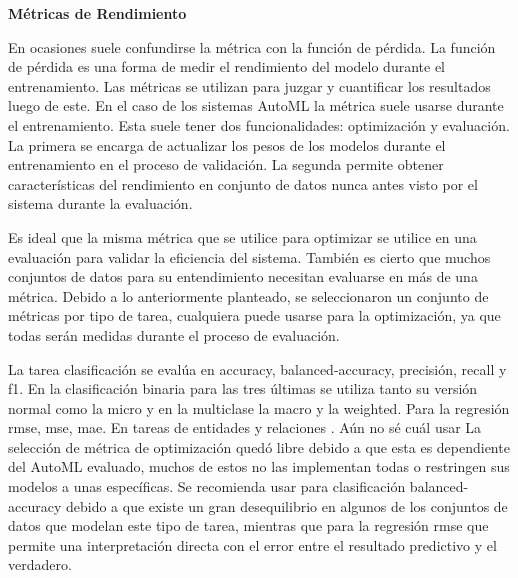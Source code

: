 \begin{flushleft} 
    {\large { \textbf{Métricas de Rendimiento}}}\label{section:metrics}
\end{flushleft}
En ocasiones suele confundirse la métrica con la función de pérdida. La función de pérdida es una forma de medir el rendimiento del modelo durante el 
entrenamiento. Las métricas se utilizan para juzgar y cuantificar los resultados luego de este. En el caso de los sistemas AutoML la métrica suele usarse 
durante el entrenamiento. Esta suele tener dos funcionalidades: optimización y evaluación. La primera se encarga de actualizar los pesos de los modelos durante el 
entrenamiento en el proceso de validación. La segunda permite obtener características del rendimiento en conjunto de datos nunca antes visto por el sistema durante 
la evaluación.

Es ideal que la misma métrica que se utilice para optimizar se utilice en una evaluación para validar la eficiencia del sistema. También es cierto que muchos conjuntos 
de datos para su entendimiento necesitan evaluarse en más de una métrica. Debido a lo anteriormente planteado, se seleccionaron un conjunto de métricas por tipo de 
tarea, cualquiera puede usarse para la optimización, ya que todas serán medidas durante el proceso de evaluación.

La tarea clasificación se evalúa en accuracy, balanced-accuracy, precisión, recall y f1.  En la clasificación binaria para las tres últimas se utiliza tanto su versión 
normal como la micro y en la multiclase la macro y la weighted. Para la regresión rmse, mse, mae. En tareas de entidades y relaciones . Aún no sé cuál usar 
La selección de métrica de optimización quedó libre debido a que esta es dependiente del AutoML evaluado, muchos de estos no las implementan todas o 
restringen sus modelos a unas específicas. Se recomienda usar para clasificación balanced-accuracy debido a que existe un gran desequilibrio en algunos de 
los conjuntos de datos que modelan este tipo de tarea, mientras que para la regresión rmse que permite una interpretación directa con el error entre el resultado 
predictivo y el verdadero.





